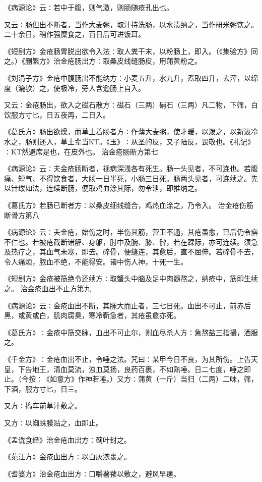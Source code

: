 \documentclass[a4paper,12pt,UTF8,twoside]{ctexbook}
\begin{document}
《病源论》云∶若中于腹，则气激，则肠随疮孔出也。

又云∶肠但出不断者，当作大麦粥，取汁持洗肠，以水渍纳之，当作研米粥饮之。二十余日，稍作强糜食之，百日后可进饭耳。

《短剧方》金疮肠胃脱出欲令入法∶取人粪干末，以粉肠上，即入。（《集验方》同之。）《删繁方》治金疮肠出方∶取桑皮线缝肠皮，用蒲黄粉之。

《刘涓子方》金疮中腹肠出不能纳方∶小麦五升，水九升，煮取四升，去滓，以绵度（漉欤）之，使极冷，旁人含逊肠上自入。

又云∶金疮肠出，欲入之磁石散方∶磁石（三两）硝石（三两）凡二物，下筛，白饮服方寸匕，日五夜再，二日入。

《葛氏方》肠出欲燥，而草土着肠者方∶作薄大麦粥，使才暖，以泼之，以新汲冷水之，肠则还入，草土辈当KT。《玉》∶从圣的反，又子陆反，畏敬也。《礼记》∶KT然避席是也，在皮外也。
治金疮肠断方第七

《病源论》云∶夫金疮肠断者，视病深浅各有死生。肠一头见者，不可连也。若腹痛、短气、不得饮食者，大肠一日半死，小肠三日死。肠两头见者，可连续之。先以针缕如法，连续断肠，便取鸡血涂其际，勿令泄，即推纳之。

《葛氏方》若肠已断者方∶以桑皮细线缝合，鸡热血涂之，乃令入。
治金疮伤筋断骨方第八

《病源论》云∶夫金疮，始伤之时，半伤其筋，营卫不通，其疮虽愈，已后仍令痹不仁也。若被疮截断诸解、身躯，肘中及腕、膝、髀，若在踝际，亦可连续。须急及热疗之，其血气未寒，即去。碎骨，便缝连，其愈后，直不屈伸。若碎骨不去，令人痛烦，脓血不绝，不能得安。诸中伤人神，十死一生。

《短剧方》金疮被筋绝令还续方∶取蟹头中脑及足中肉髓熬之，纳疮中，筋即生续之。
治金疮血出不止方第九

《病源论》云∶金疮血出不断，其脉大而止者，三七日死。血出不可止，前赤后黑，或黄或白，肌肉腐臭，寒冷靳急者，其疮虽愈亦死。

《葛氏方》∶金疮中筋交脉，血出不可止尔，则血尽杀人方∶急熬盐三指撮，酒服之。

《千金方》∶金疮血出不止，令唾之法。咒曰∶某甲今日不良，为其所伤。上告天皇，下告地王，清血莫流，浊血莫扬，良药百裹，不如熟唾。日二七度，唾之即止。（今按∶《如意方》作神若唾。）又方∶蒲黄（一斤）当归（二两）二味，筛，下酒，服方寸匕，日三。

又方∶捣车前草汁敷之。

又方∶以蜘蛛膜贴之，血即止。

《孟诜食经》治金疮血出方∶蓟叶封之。

《范汪方》金疮血出方∶以白灰浓裹之。

《耆婆方》治金疮血出方∶口嚼薯蓣以敷之，避风早瘥。
\end{document}
